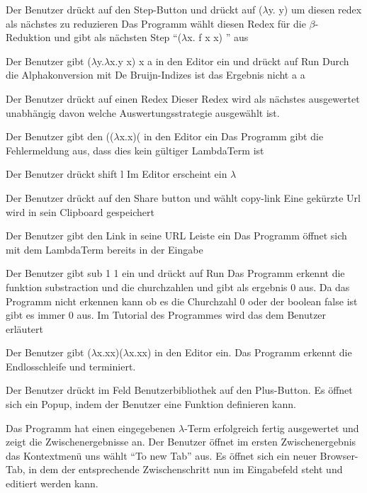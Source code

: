 \documentclass[parskip=full,11pt,twoside]{scrartcl}
\begin{document}
{Der Benutzer drückt auf den Step-Button und drückt auf ($\lambda$y. y) um diesen redex als nächstes zu reduzieren}
{Das Programm wählt diesen Redex für die $\beta$-Reduktion und gibt als nächsten Step \enquote{($\lambda$x. f x x) } aus  }


{ Der Benutzer gibt ($\lambda$y.$\lambda$x.y x) x a in den Editor ein und drückt auf Run}
{ Durch die Alphakonversion mit De Bruijn-Indizes ist das Ergebnis nicht a  a  }

 { Der Benutzer drückt auf einen Redex}
{ Dieser Redex wird als nächstes ausgewertet unabhängig davon welche Auswertungsstrategie ausgewählt ist. }

{ Der Benutzer gibt den (($\lambda$x.x)( in den Editor ein }
{ Das Programm gibt die Fehlermeldung aus, dass dies kein gültiger LambdaTerm ist }

{ Der Benutzer drückt shift l }
{Im Editor erscheint ein $\lambda$}

{ Der Benutzer drückt auf den Share button und wählt copy-link}
{ Eine gekürzte Url wird in sein Clipboard gespeichert }

{Der Benutzer gibt den Link in seine URL Leiste ein }
{ Das Programm öffnet sich mit dem LambdaTerm bereits in der Eingabe }

{ Der Benutzer gibt sub 1 1 ein und drückt auf Run }
{ Das Programm erkennt die funktion substraction und die churchzahlen und gibt als ergebnis 0 aus. Da das Programm nicht erkennen kann ob es die Churchzahl 0 oder der boolean false ist gibt es immer 0 aus. Im Tutorial des Programmes wird das dem Benutzer erläutert }

{Der Benutzer gibt ($\lambda$x.xx)($\lambda$x.xx) in den Editor ein.}
{Das Programm erkennt die Endlosschleife und terminiert.}

{Der Benutzer drückt im Feld Benutzerbibliothek auf den Plus-Button.}
{Es öffnet sich ein Popup, indem der Benutzer eine Funktion definieren kann.}

\teststep
{Das Programm hat einen eingegebenen $\lambda$-Term erfolgreich fertig ausgewertet und zeigt die Zwischenergebnisse an.}
{Der Benutzer öffnet im ersten Zwischenergebnis das Kontextmenü uns wählt \enquote{To new Tab} aus.}
{Es öffnet sich ein neuer Browser-Tab, in dem der entsprechende Zwischenschritt nun im Eingabefeld steht und editiert werden kann.}
\end{document}
